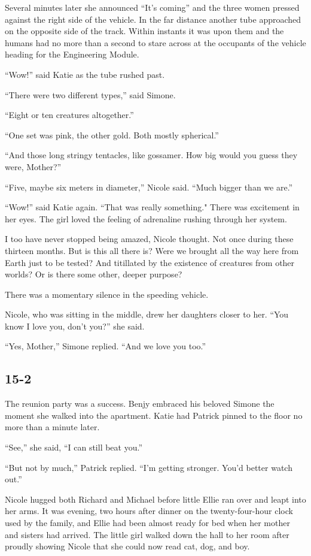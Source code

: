 \documentclass[]{article}
\begin{document}
{Several minutes later she announced “It’s coming” and the three women pressed against the right side of the vehicle.  In the far distance another tube approached on the opposite side of the track.  Within instants it was upon them and the humans had no more than a second to stare across at the occupants of the vehicle heading for the Engineering Module.

“Wow!” said Katie as the tube rushed past.

“There were two different types,” said Simone.

“Eight or ten creatures altogether.”

“One set was pink, the other gold.  Both mostly spherical.”

“And those long stringy tentacles, like gossamer.  How big would you guess they were, Mother?”

“Five, maybe six meters in diameter,” Nicole said.  “Much bigger than we are.”

“Wow!” said Katie again.  “That was really something."  There was excitement in her eyes.  The girl loved the feeling of adrenaline rushing through her system.

I too have never stopped being amazed, Nicole thought.  Not once during these thirteen months.  But is this all there is? Were we brought all the way here from Earth just to be tested? And titillated by the existence of creatures from other worlds? Or is there some other, deeper purpose?

There was a momentary silence in the speeding vehicle.

Nicole, who was sitting in the middle, drew her daughters closer to her.  “You know I love you, don’t you?” she said.

“Yes, Mother,” Simone replied.  “And we love you too.”

\subsection*{15-2}

The reunion party was a success.  Benjy embraced his beloved Simone the moment she walked into the apartment.  Katie had Patrick pinned to the floor no more than a minute later.

“See,” she said, “I can still beat you.”

“But not by much,” Patrick replied.  “I’m getting stronger.  You’d better watch out.”

Nicole hugged both Richard and Michael before little Ellie ran over and leapt into her arms.  It was evening, two hours after dinner on the twenty-four-hour clock used by the family, and Ellie had been almost ready for bed when her mother and sisters had arrived.  The little girl walked down the hall to her room after proudly showing Nicole that she could now read cat, dog, and boy.

}
\end{document}
